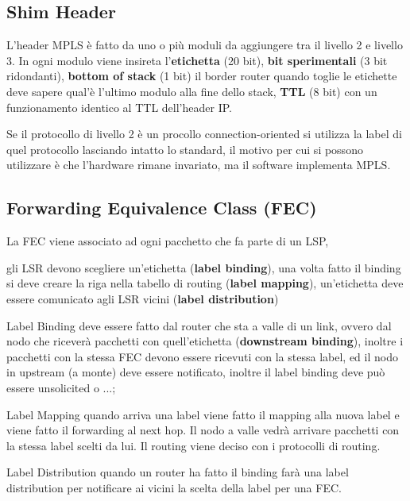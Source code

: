 \documentclass[12pt]{article}
\begin{document}
\subsection{Shim Header}
L'header MPLS \`e fatto da uno o pi\`u moduli da aggiungere tra il livello 2 e livello 3. In ogni modulo viene insireta l'\textbf{etichetta} (20 bit), \textbf{bit sperimentali} (3 bit ridondanti), \textbf{bottom of stack} (1 bit) il border router quando toglie le etichette deve sapere qual'\`e l'ultimo modulo alla fine dello stack, \textbf{TTL} (8 bit) con un funzionamento identico al TTL dell'header IP.

Se il protocollo di livello 2 \`e un procollo connection-oriented si utilizza la label di quel protocollo lasciando intatto lo standard, il motivo per cui si possono utilizzare \`e che l'hardware rimane invariato, ma il software implementa MPLS.

\subsection{Forwarding Equivalence Class (FEC)}
La FEC viene associato ad ogni pacchetto che fa parte di un LSP, 

gli LSR devono scegliere un'etichetta (\textbf{label binding}), una volta fatto il binding si deve creare la riga nella tabello di routing (\textbf{label mapping}), un'etichetta deve essere comunicato agli LSR vicini (\textbf{label distribution})

Label Binding deve essere fatto dal router che sta a valle di un link, ovvero dal nodo che ricever\`a pacchetti con quell'etichetta (\textbf{downstream binding}), inoltre i pacchetti con la stessa FEC devono essere ricevuti con la stessa label, ed il nodo in upstream (a monte) deve essere notificato, inoltre il label binding deve pu\`o essere unsolicited o ...;

Label Mapping quando arriva una label viene fatto il mapping alla nuova label e viene fatto il forwarding al next hop. Il nodo a valle vedr\`a arrivare pacchetti con la stessa label scelti da lui. Il routing viene deciso con i protocolli di routing.

Label Distribution quando un router ha fatto il binding far\`a una label distribution per notificare ai vicini la scelta della label per una FEC.
\end{document}
